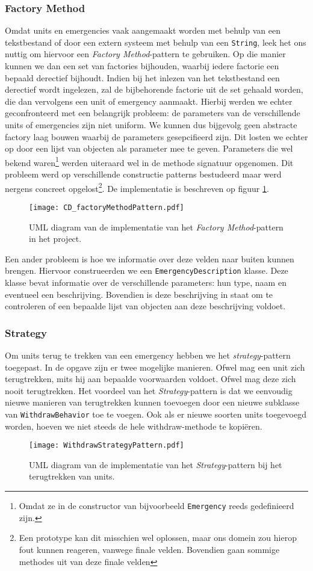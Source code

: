\subsubsection{Factory Method}
Omdat units en emergencies vaak aangemaakt worden met behulp van een tekstbestand of door een extern systeem met behulp van een \verb+String+, leek het ons nuttig om hiervoor een \textit{Factory Method}-pattern te gebruiken. Op die manier kunnen we dan een set van factories bijhouden, waarbij iedere factorie een bepaald derectief bijhoudt. Indien bij het inlezen van het tekstbestand een derectief wordt ingelezen, zal de bijbehorende factorie uit de set gehaald worden, die dan vervolgens een unit of emergency aanmaakt. Hierbij werden we echter geconfronteerd met een belangrijk probleem: de parameters van de verschillende units of emergencies zijn niet uniform. We kunnen dus bijgevolg geen abstracte factory laag bouwen waarbij de parameters gesepcifieerd zijn. Dit losten we echter op door een lijst van objecten als parameter mee te geven. Parameters die wel bekend waren\footnote{Omdat ze in de constructor van bijvoorbeeld \verb+Emergency+ reeds gedefinieerd zijn.} werden uiteraard wel in de methode signatuur opgenomen. Dit probleem werd op verschillende constructie patterns bestudeerd maar werd nergens concreet opgelost\footnote{Een prototype kan dit misschien wel oplossen, maar ons domein zou hierop fout kunnen reageren, vanwege finale velden. Bovendien gaan sommige methodes uit van deze finale velden}. De implementatie is beschreven op figuur \ref{fig:factoryMethodPattern}.
\begin{figure}[thtb]
\texttt{[image: CD\_factoryMethodPattern.pdf]}
\caption{UML diagram van de implementatie van het \textit{Factory Method}-pattern in het project.}
\label{fig:factoryMethodPattern}
\end{figure}
Een ander probleem is hoe we informatie over deze velden naar buiten kunnen brengen. Hiervoor construeerden we een \verb+EmergencyDescription+ klasse. Deze klasse bevat informatie over de verschillende parameters: hun type, naam en eventueel een beschrijving. Bovendien is deze beschrijving in staat om te controleren of een bepaalde lijst van objecten aan deze beschrijving voldoet.
\subsubsection{Strategy}
Om units terug te trekken van een emergency hebben we het \textit{strategy}-pattern toegepast. In de opgave zijn er twee mogelijke manieren.
Ofwel mag een unit zich terugtrekken, mits hij aan bepaalde voorwaarden voldoet. Ofwel mag deze zich nooit terugtrekken.
Het voordeel van het \textit{Strategy}-pattern is dat we eenvoudig nieuwe manieren van terugtrekken kunnen toevoegen door een nieuwe subklasse van \texttt{WithdrawBehavior} toe te voegen.
Ook als er nieuwe soorten units toegevoegd worden, hoeven we niet steeds de hele withdraw-methode te kopi\"eren.
\begin{figure}[thtb]
\texttt{[image: WithdrawStrategyPattern.pdf]}
\caption{UML diagram van de implementatie van het \textit{Strategy}-pattern bij het terugtrekken van units.}
\label{fig:withdrawStrategyPattern}
\end{figure}